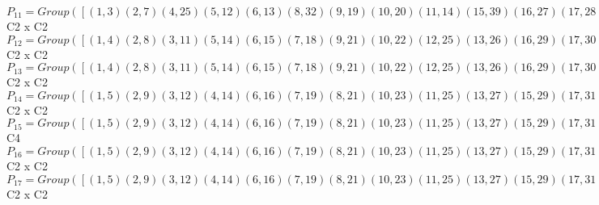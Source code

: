 \documentclass[varwidth=\maxdimen,border=10]{standalone}
\begin{document}
\begin{tabular}
$P_{11} = Group( [ ( 1, 3)( 2, 7)( 4,25)( 5,12)( 6,13)( 8,32)( 9,19)(10,20)(11,14)(15,39)(16,27)(17,28)(18,21)(22,43)(23,34)(24,35)(26,29)(30,47)(31,41)(33,36)(37,48)(38,45)(40,42)(44,46), ( 1, 9)( 2, 5)( 3,19)( 4,21)( 6,38)( 7,12)( 8,14)(10,31)(11,32)(13,45)(15,46)(16,24)(17,23)(18,25)(20,41)(22,42)(26,48)(27,35)(28,34)(29,37)(30,36)(33,47)(39,44)(40,43) ] )\cong$ C2 x C2\ \\
$P_{12} = Group( [ ( 1, 4)( 2, 8)( 3,11)( 5,14)( 6,15)( 7,18)( 9,21)(10,22)(12,25)(13,26)(16,29)(17,30)(19,32)(20,33)(23,36)(24,37)(27,39)(28,40)(31,42)(34,43)(35,44)(38,46)(41,47)(45,48), ( 1, 2)( 3, 7)( 4, 8)( 5, 9)( 6,24)(10,17)(11,18)(12,19)(13,35)(14,21)(15,37)(16,38)(20,28)(22,30)(23,31)(25,32)(26,44)(27,45)(29,46)(33,40)(34,41)(36,42)(39,48)(43,47) ] )\cong$ C2 x C2\ \\
$P_{13} = Group( [ ( 1, 4)( 2, 8)( 3,11)( 5,14)( 6,15)( 7,18)( 9,21)(10,22)(12,25)(13,26)(16,29)(17,30)(19,32)(20,33)(23,36)(24,37)(27,39)(28,40)(31,42)(34,43)(35,44)(38,46)(41,47)(45,48), ( 1, 9)( 2, 5)( 3,19)( 4,21)( 6,38)( 7,12)( 8,14)(10,31)(11,32)(13,45)(15,46)(16,24)(17,23)(18,25)(20,41)(22,42)(26,48)(27,35)(28,34)(29,37)(30,36)(33,47)(39,44)(40,43) ] )\cong$ C2 x C2\ \\
$P_{14} = Group( [ ( 1, 5)( 2, 9)( 3,12)( 4,14)( 6,16)( 7,19)( 8,21)(10,23)(11,25)(13,27)(15,29)(17,31)(18,32)(20,34)(22,36)(24,38)(26,39)(28,41)(30,42)(33,43)(35,45)(37,46)(40,47)(44,48), ( 1, 8)( 2, 4)( 3,18)( 5,21)( 6,37)( 7,11)( 9,14)(10,30)(12,32)(13,44)(15,24)(16,46)(17,22)(19,25)(20,40)(23,42)(26,35)(27,48)(28,33)(29,38)(31,36)(34,47)(39,45)(41,43) ] )\cong$ C2 x C2\ \\
$P_{15} = Group( [ ( 1, 5)( 2, 9)( 3,12)( 4,14)( 6,16)( 7,19)( 8,21)(10,23)(11,25)(13,27)(15,29)(17,31)(18,32)(20,34)(22,36)(24,38)(26,39)(28,41)(30,42)(33,43)(35,45)(37,46)(40,47)(44,48), ( 1,32, 5,18)( 2,25, 9,11)( 3,21,12, 8)( 4, 7,14,19)( 6,48,16,44)(10,47,23,40)(13,46,27,37)(15,35,29,45)(17,43,31,33)(20,42,34,30)(22,28,36,41)(24,39,38,26) ] )\cong$ C4\ \\
$P_{16} = Group( [ ( 1, 5)( 2, 9)( 3,12)( 4,14)( 6,16)( 7,19)( 8,21)(10,23)(11,25)(13,27)(15,29)(17,31)(18,32)(20,34)(22,36)(24,38)(26,39)(28,41)(30,42)(33,43)(35,45)(37,46)(40,47)(44,48), ( 1, 2)( 3, 7)( 4, 8)( 5, 9)( 6,24)(10,17)(11,18)(12,19)(13,35)(14,21)(15,37)(16,38)(20,28)(22,30)(23,31)(25,32)(26,44)(27,45)(29,46)(33,40)(34,41)(36,42)(39,48)(43,47) ] )\cong$ C2 x C2\ \\
$P_{17} = Group( [ ( 1, 5)( 2, 9)( 3,12)( 4,14)( 6,16)( 7,19)( 8,21)(10,23)(11,25)(13,27)(15,29)(17,31)(18,32)(20,34)(22,36)(24,38)(26,39)(28,41)(30,42)(33,43)(35,45)(37,46)(40,47)(44,48), ( 1, 4)( 2, 8)( 3,11)( 5,14)( 6,15)( 7,18)( 9,21)(10,22)(12,25)(13,26)(16,29)(17,30)(19,32)(20,33)(23,36)(24,37)(27,39)(28,40)(31,42)(34,43)(35,44)(38,46)(41,47)(45,48) ] )\cong$ C2 x C2\ \\

\end{tabular}
\end{document}
